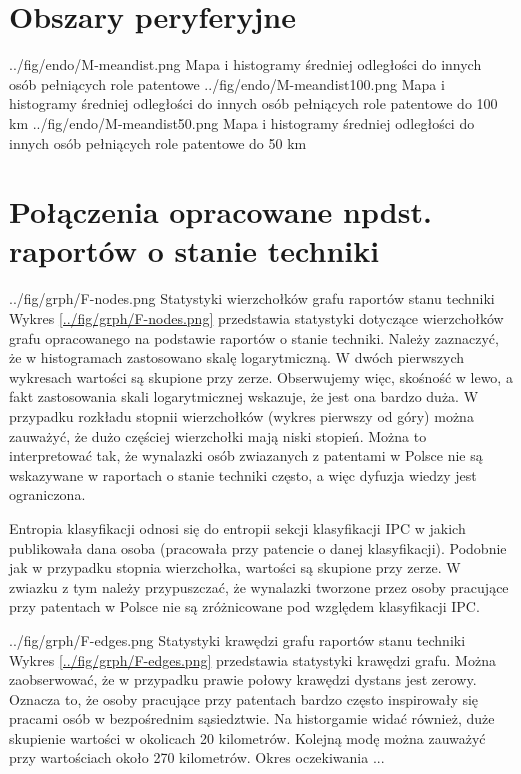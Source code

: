     \newpage\section
  {Obszary peryferyjne}

  \newpage\charttripled
{../fig/endo/M-meandist.png}
{ Mapa i histogramy średniej odległości do innych osób pełniących role patentowe }
{../fig/endo/M-meandist100.png}
{ Mapa i histogramy średniej odległości do innych osób pełniących role patentowe do 100 km }
{../fig/endo/M-meandist50.png}
{ Mapa i histogramy średniej odległości do innych osób pełniących role patentowe do 50 km }




    \newpage\section
  {Połączenia opracowane npdst. raportów o stanie techniki}

  \chartside
{../fig/grph/F-nodes.png}
{ Statystyki wierzchołków grafu raportów stanu techniki }
{ Wykres \cref{../fig/grph/F-nodes.png} przedstawia statystyki
  dotyczące wierzchołków grafu opracowanego na podstawie raportów
  o stanie techniki. Należy zaznaczyć, że w histogramach zastosowano
  skalę logarytmiczną. W dwóch pierwszych wykresach wartości są skupione
  przy zerze. Obserwujemy więc, skośność w lewo, a fakt zastosowania
  skali logarytmicznej wskazuje, że jest ona bardzo duża.
  W przypadku rozkładu stopnii wierzchołków (wykres pierwszy od góry)
  można zauważyć, że dużo częściej wierzchołki mają niski stopień.
  Można to interpretować tak, że wynalazki osób zwiazanych z patentami w Polsce
  nie są wskazywane w raportach o stanie techniki często, a więc dyfuzja wiedzy
  jest ograniczona. }

Entropia klasyfikacji odnosi się do entropii sekcji klasyfikacji \ac{IPC} w jakich
publikowała dana osoba (pracowała przy patencie o danej klasyfikacji).
Podobnie jak w przypadku stopnia wierzchołka, wartości są skupione przy zerze.
W zwiazku z tym należy przypuszczać, że wynalazki tworzone przez osoby
pracujące przy patentach w Polsce nie są zróżnicowane pod względem klasyfikacji \ac{IPC}.


\newpage

  \chartside
{../fig/grph/F-edges.png}
{ Statystyki krawędzi grafu raportów stanu techniki }
{ Wykres \cref{../fig/grph/F-edges.png} przedstawia statystyki krawędzi grafu.
  Można zaobserwować, że w przypadku prawie połowy krawędzi dystans jest zerowy.
  Oznacza to, że osoby pracujące przy patentach bardzo często inspirowały się
  pracami osób w bezpośrednim sąsiedztwie. Na historgamie widać również,
  duże skupienie wartości w okolicach 20 kilometrów. Kolejną modę można zauważyć
  przy wartościach około 270 kilometrów.
  Okres oczekiwania  ...}

